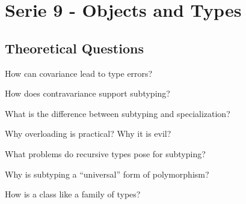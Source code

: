 \documentclass [11pt, a4wide, twoside]{article}
\begin{document}
\section*{
    \xspace{}Serie 9 - Objects and Types}

\subsection{Theoretical Questions}

\begin{myenumerate}



\item How can covariance lead to type errors?


\item How does contravariance support subtyping?



\item What is the difference between subtyping and specialization?

\solution{}


\item Why overloading is practical? Why it is evil?

\solution{}



\item What problems do recursive types pose for subtyping?

\solution{}


\item Why is subtyping a ``universal'' form of polymorphism?

\solution{}


\item How is a class like a family of types? 

\solution{}

\end{myenumerate}
\end{document}
